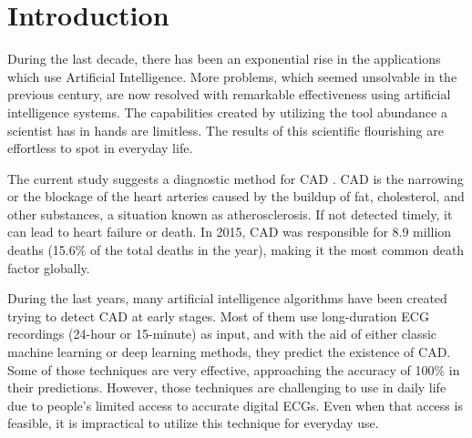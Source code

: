 \section{Introduction}
\label{sec:intro}

During the last decade, there has been an exponential rise in the applications which use Artificial Intelligence. More problems, which seemed unsolvable in the previous century, are now resolved with remarkable effectiveness using artificial intelligence systems. The capabilities created by utilizing the tool abundance a scientist has in hands are limitless. The results of this scientific flourishing are effortless to spot in everyday life.


The current study suggests a diagnostic method for CAD \cite{CAD_article}. CAD is the narrowing or the blockage of the heart arteries caused by the buildup of fat, cholesterol, and other substances, a situation known as atherosclerosis. If not detected timely, it can lead to heart failure or death. In 2015, CAD was responsible for 8.9 million deaths (15.6\% of the total deaths in the year), making it the most common death factor globally.

During the last years, many artificial intelligence algorithms have been created trying to detect CAD at early stages. Most of them use long-duration ECG recordings (24-hour or 15-minute) as input, and with the aid of either classic machine learning or deep learning methods, they predict the existence of CAD.
Some of those techniques are very effective, approaching the accuracy of 100\% in their predictions. However, those techniques are challenging to use in daily life due to people's limited access to accurate digital ECGs. Even when that access is feasible, it is impractical to utilize this technique for everyday use.

